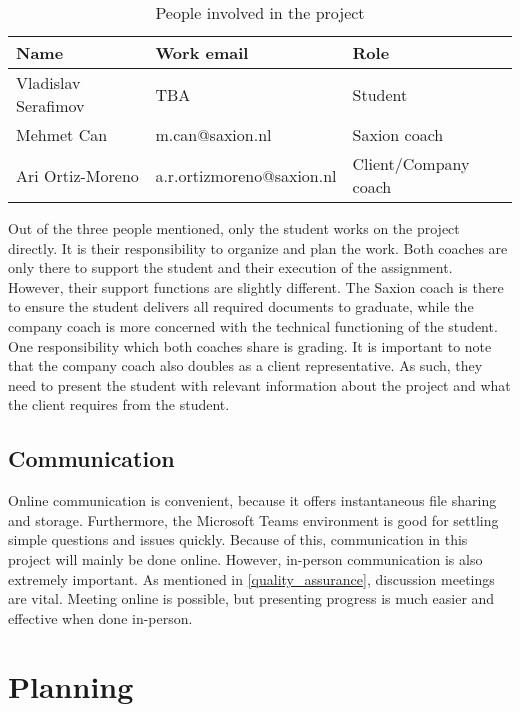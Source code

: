 \documentclass{report}
\begin{document}
	\begin{table}[h]
		\centering
		\begin{tabular}{|l|l|l|}
			\hline
			Name                & Work email              & Role          \\ \hline
			Vladislav Serafimov & TBA   & Student       \\ \hline
			Mehmet Can   & m.can@saxion.nl & Saxion coach  \\ \hline
			Ari Ortiz-Moreno   & a.r.ortizmoreno@saxion.nl     & Client/Company coach \\ \hline
		\end{tabular}
		\caption{People involved in the project}
		\label{involved}
	\end{table}
	
	Out of the three people mentioned, only the student works on the project directly. It is their responsibility to organize and plan the work. Both coaches are only there to support the student and their execution of the assignment. However, their support functions are slightly different. The Saxion coach is there to ensure the student delivers all required documents to graduate, while the company coach is more concerned with the technical functioning of the student. One responsibility which both coaches share is grading. It is important to note that the company coach also doubles as a client representative. As such, they need to present the student with relevant information about the project and what the client requires from the student.
	
	\section{Communication} \label{communication}
	Online communication is convenient, because it offers instantaneous file sharing and storage. Furthermore, the Microsoft Teams environment is good for settling simple questions and issues quickly. Because of this, communication in this project will mainly be done online. However, in-person communication is also extremely important. As mentioned in \ref{quality_assurance}, discussion meetings are vital. Meeting online is possible, but presenting progress is much easier and effective when done in-person.
	
	\chapter{Planning}\label{plan}
	
\end{document}
